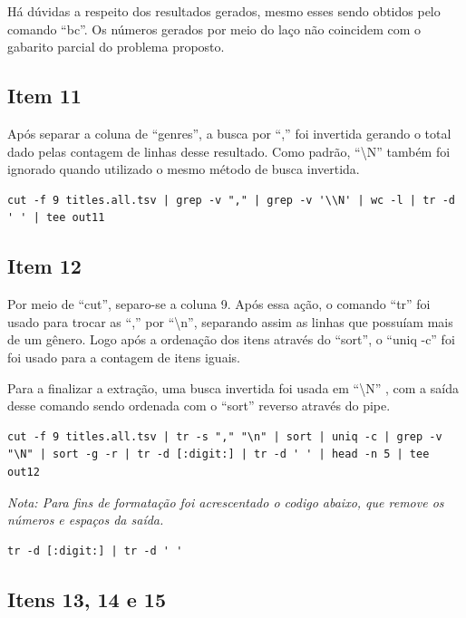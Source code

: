 \documentclass[12pt]{article}
\begin{document}
Há dúvidas a respeito dos resultados gerados, mesmo esses sendo obtidos pelo comando ``bc''. Os números gerados por meio do laço não coincidem com o gabarito parcial do problema proposto.

\subsection*{Item 11}

Após separar a coluna de ``genres'', a busca por  ``,''  foi invertida gerando o total dado pelas contagem de linhas desse resultado. Como padrão, ``\textbackslash N'' também foi ignorado quando utilizado o mesmo método de busca invertida.

\begin{verbatim}
cut -f 9 titles.all.tsv | grep -v "," | grep -v '\\N' | wc -l | tr -d ' ' | tee out11
\end{verbatim}

\subsection*{Item 12}

Por meio de ``cut'',  separo-se a coluna 9. Após essa ação, o comando ``tr''  foi usado para trocar as ``,'' por  ``\textbackslash n'', separando assim as linhas que possuíam mais de um gênero.  Logo após a ordenação dos itens através do ``sort'', o ``uniq -c'' foi  foi usado para a contagem de itens iguais.

Para a finalizar a extração, uma busca invertida foi usada em ``\textbackslash N'' , com a saída desse comando sendo ordenada com o ``sort'' reverso através do pipe.

\begin{verbatim}
cut -f 9 titles.all.tsv | tr -s "," "\n" | sort | uniq -c | grep -v "\N" | sort -g -r | tr -d [:digit:] | tr -d ' ' | head -n 5 | tee out12
\end{verbatim}

\textit{Nota: Para fins de formatação foi acrescentado o codigo abaixo, que remove os números e espaços da saída.}

\begin{verbatim}
tr -d [:digit:] | tr -d ' '
\end{verbatim}

\subsection*{Itens 13, 14 e 15}
\end{document}
